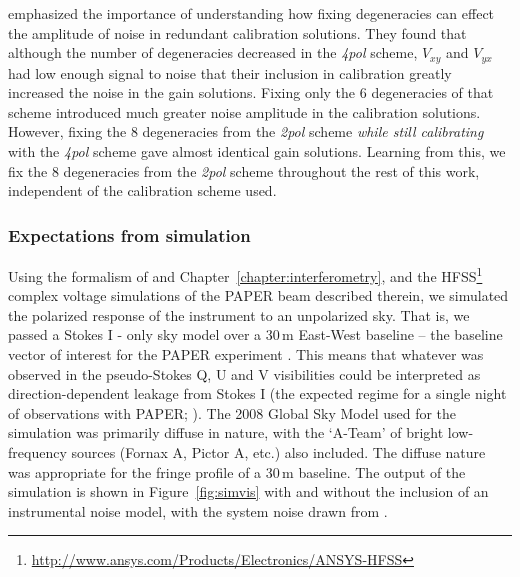 \citet{Dillon.17} emphasized the importance of understanding how fixing degeneracies can effect the amplitude of noise in redundant calibration solutions. They found that although the number of degeneracies decreased in the \textit{4pol} scheme, $V_{xy}$ and $V_{yx}$ had low enough signal to noise that their inclusion in calibration greatly increased the noise in the gain solutions. Fixing only the 6 degeneracies of that scheme introduced much greater noise amplitude in the calibration solutions. However, fixing the 8 degeneracies from the \textit{2pol} scheme \textit{while still calibrating} with the \textit{4pol} scheme gave almost identical gain solutions. Learning from this, we fix the 8 degeneracies from the \textit{2pol} scheme throughout the rest of this work, independent of the calibration scheme used.

\subsubsection{Expectations from simulation}  

Using the formalism of \cite{Nunhokee.17} and Chapter~\ref{chapter:interferometry}, and the HFSS\footnote{\url{http://www.ansys.com/Products/Electronics/ANSYS-HFSS}} complex voltage simulations of the PAPER beam described therein, we simulated the polarized response of the instrument to an unpolarized sky. That is, we passed a Stokes I - only sky model \citep[][]{GSM.08} over a 30\,m East-West baseline -- the baseline vector of interest for the PAPER experiment \citep{Parsons.14, Jacobs.15, Ali.15, Moore.17}. This means that whatever was observed in the pseudo-Stokes Q, U and V visibilities could be interpreted as direction-dependent leakage from Stokes I (the expected regime for a single night of observations with PAPER; \citealt{Kohn.16}). The 2008 Global Sky Model used for the simulation was primarily diffuse in nature, with the `A-Team' of bright low-frequency sources (Fornax A, Pictor A, etc.) also included. The diffuse nature was appropriate for the fringe profile of a 30\,m baseline. The output of the simulation is shown in Figure~\ref{fig:simvis} with and without the inclusion of an instrumental noise model, with the system noise drawn from \cite{Moore.17}.

